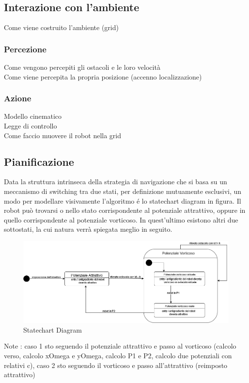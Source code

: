 \documentclass[14pt,twoside,a4paper]{extarticle}
\begin{document}
\subsection{Interazione con l'ambiente}
Come viene costruito l'ambiente (grid)\\
\subsubsection{Percezione}
Come vengono percepiti gli ostacoli e le loro velocità\\
Come viene percepita la propria posizione (accenno localizzazione)\\
\subsubsection{Azione}
Modello cinematico\\
Legge di controllo\\
Come faccio muovere il robot nella grid

\subsection{Pianificazione}
Data la struttura intrinseca della strategia di navigazione che si basa su un meccanismo di switching tra due stati, per definizione mutuamente esclusivi, un modo per modellare visivamente l'algoritmo é lo statechart diagram in figura. Il robot può trovarsi o nello stato corrispondente al potenziale attrattivo, oppure in quello corrispondente al potenziale vorticoso. In quest'ultimo esistono altri due sottostati, la cui natura verrà spiegata meglio in seguito.
	
\begin{figure}[H]
\caption{Statechart Diagram} \label{state}
\includegraphics[width=\textwidth]{stateDiagram.png}
\end{figure}
	
Note	: caso 1 sto seguendo il potenziale attrattivo e passo al vorticoso (calcolo verso, calcolo xOmega e yOmega, calcolo P1 e P2, calcolo due potenziali con relativi c), caso 2 sto seguendo il vorticoso e passo all'attrattivo (reimposto attrattivo)
	
\end{document}
